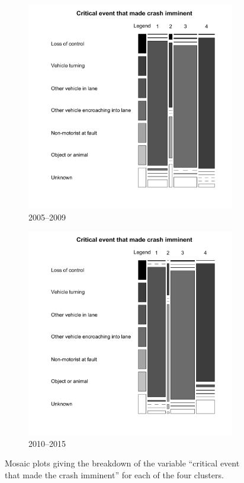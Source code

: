 \begin{figure}[t]
        \begin{subfigure}{.5\textwidth}
                \includegraphics[width=1\linewidth]{crit_event_0509.png}
                \caption{2005--2009}
        \end{subfigure}%
        \begin{subfigure}{.5\textwidth}
                \includegraphics[width=1\linewidth]{crit_event.png}
                \caption{2010--2015}
        \end{subfigure}
        \caption{Mosaic plots giving the breakdown of the variable ``critical event that made the crash imminent'' for each of the four clusters.}
        \label{fig:clus12}
\end{figure}
